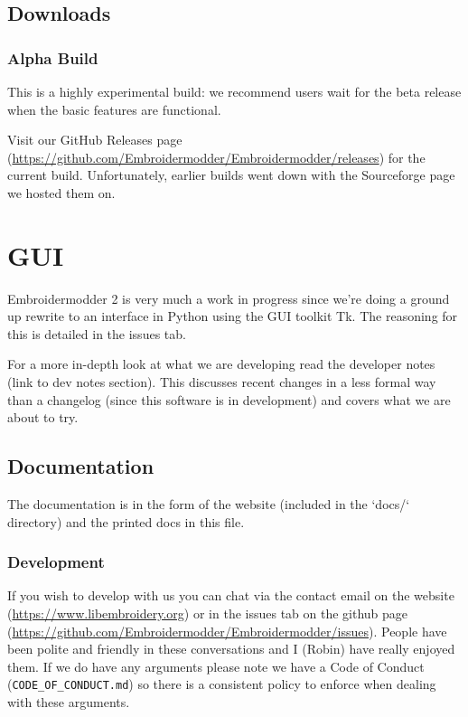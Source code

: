 \documentclass[a4paper]{report}
\begin{document}
\section{Downloads}

\subsection{Alpha Build}

This is a highly experimental build: we recommend users wait for the beta
release when the basic features are functional.

Visit our  GitHub Releases page
(\url{https://github.com/Embroidermodder/Embroidermodder/releases})
for the current build. Unfortunately, earlier builds went down with the
Sourceforge page we hosted them on.

\chapter{GUI}

Embroidermodder 2 is very much a work in progress since we're doing a ground
up rewrite to an interface in Python using the GUI toolkit Tk. The reasoning for
this is detailed in the issues tab.

For a more in-depth look at what we are developing read the developer notes (link to dev notes
section). This discusses recent changes in a less formal way than a changelog (since this
software is in development) and covers what we are about to try.

\section{Documentation}

The documentation is in the form of the website
(included in the `docs/` directory) and the printed docs in this file.

\subsection{Development}

If you wish to develop with us you can chat via the contact email on the
website (\url{https://www.libembroidery.org}) or in the issues tab on the
github page (\url{https://github.com/Embroidermodder/Embroidermodder/issues}).
People have been polite and friendly in these conversations and I (Robin) have
really enjoyed them. If we do have any arguments please note we have a Code of
Conduct (\texttt{CODE\_OF\_CONDUCT.md}) so there is a consistent policy to enforce when
dealing with these arguments.
\end{document}
